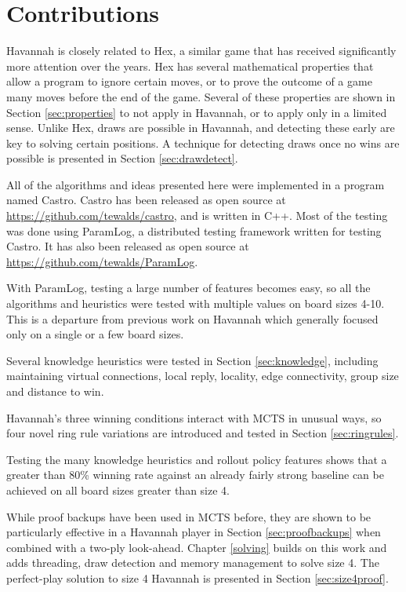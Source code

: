 \section{Contributions}

Havannah is closely related to Hex, a similar game that has received significantly more attention over the years. Hex has several mathematical properties that allow a program to ignore certain moves, or to prove the outcome of a game many moves before the end of the game. Several of these properties are shown in Section \ref{sec:properties} to not apply in Havannah, or to apply only in a limited sense. Unlike Hex, draws are possible in Havannah, and detecting these early are key to solving certain positions. A technique for detecting draws once no wins are possible is presented in Section \ref{sec:drawdetect}.

All of the algorithms and ideas presented here were implemented in a program named Castro. Castro has been released as open source at \url{https://github.com/tewalds/castro}, and is written in C++. Most of the testing was done using ParamLog, a distributed testing framework written for testing Castro. It has also been released as open source at \url{https://github.com/tewalds/ParamLog}.

With ParamLog, testing a large number of features becomes easy, so all the algorithms and heuristics were tested with multiple values on board sizes 4-10. This is a departure from previous work on Havannah which generally focused only on a single or a few board sizes.

Several knowledge heuristics were tested in Section \ref{sec:knowledge}, including maintaining virtual connections, local reply, locality, edge connectivity, group size and distance to win.

Havannah's three winning conditions interact with MCTS in unusual ways, so four novel ring rule variations are introduced and tested in Section \ref{sec:ringrules}.

Testing the many knowledge heuristics and rollout policy features shows that a greater than 80\% winning rate against an already fairly strong baseline can be achieved on all board sizes greater than size 4.

While proof backups have been used in MCTS before, they are shown to be particularly effective in a Havannah player in Section \ref{sec:proofbackups} when combined with a two-ply look-ahead. Chapter \ref{solving} builds on this work and adds threading, draw detection and memory management to solve size 4. The perfect-play solution to size 4 Havannah is presented in Section \ref{sec:size4proof}.


